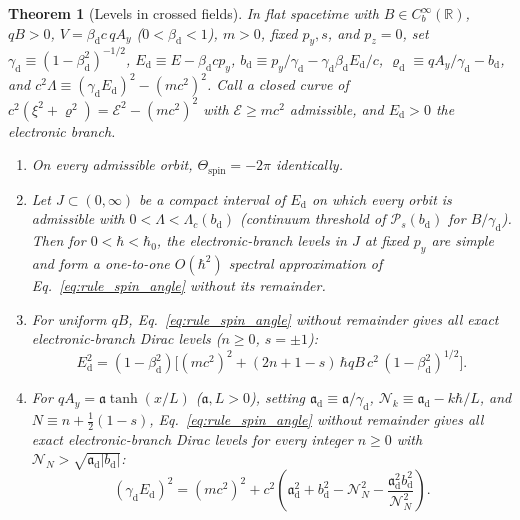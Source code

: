 \documentclass[aps,prd,onecolumn,tightenlines,nofootinbib,notitlepage,10pt,floatfix]{revtex4-2}
\theoremstyle{indentedtheorem}
\newtheorem{theorem}{Theorem}
\begin{document}
\begin{theorem}[Levels in crossed fields]\label{thm:levels_crossed}
In flat spacetime with $B\in C_b^\infty(\mathbb{R})$, $qB>0$, $V=\beta_\text{d}c\,qA_y$ ($0<\beta_\text{d}<1$), $m>0$, fixed $p_y,s$, and $p_z=0$, set $\gamma_\text{d}\equiv(1-\beta_\text{d}^2)^{-1/2}$, $E_\text{d}\equiv E-\beta_\text{d}cp_y$, $b_\text{d}\equiv p_y/\gamma_\text{d}-\gamma_\text{d}\beta_\text{d}E_\text{d}/c$, $\varrho_\text{d}\equiv qA_y/\gamma_\text{d}-b_\text{d}$, and $c^2\Lambda\equiv(\gamma_\text{d}E_\text{d})^2-(mc^2)^2$. Call a closed curve of $c^2(\xi^2+\varrho^2)=\mathcal{E}^2-(mc^2)^2$ with $\mathcal{E}\ge mc^2$ admissible, and $E_\text{d}>0$ the electronic branch.
\begin{enumerate}[label=(\alph*)]
\item On every admissible orbit, $\Theta_\text{spin}=-2\pi$ identically.
\item Let $J\subset(0,\infty)$ be a compact interval of $E_\text{d}$ on which every orbit is admissible with $0<\Lambda<\Lambda_c(b_\text{d})$ (continuum threshold of $\mathcal{P}_s(b_\text{d})$ for $B/\gamma_\text{d}$). Then for $0<\hbar<\hbar_0$, the electronic-branch levels in $J$ at fixed $p_y$ are simple and form a one-to-one $O(\hbar^2)$ spectral approximation of Eq.~\eqref{eq:rule_spin_angle} without its remainder.
\item For uniform $qB$, Eq.~\eqref{eq:rule_spin_angle} without remainder gives all exact electronic-branch Dirac levels ($n\ge 0$, $s=\pm 1$):
\begin{equation}
    E_\text{d}^2 = (1-\beta_\text{d}^2)\Big[(mc^2)^2 + (2n+1-s)\,\hbar qB\,c^2\,(1-\beta_\text{d}^2)^{1/2}\Big] .
    \label{eq:crossed_exact}
\end{equation}
\item For $qA_y=\mathfrak{a}\tanh(x/L)$ ($\mathfrak{a},L>0$), setting $\mathfrak{a}_\text{d}\equiv\mathfrak{a}/\gamma_\text{d}$, $\mathcal{N}_k\equiv\mathfrak{a}_\text{d}-k\hbar/L$, and $N\equiv n+\tfrac{1}{2}(1-s)$, Eq.~\eqref{eq:rule_spin_angle} without remainder gives all exact electronic-branch Dirac levels for every integer $n\ge 0$ with $\mathcal{N}_N>\sqrt{\mathfrak{a}_\text{d}|b_\text{d}|}$:
\begin{equation}
    (\gamma_\text{d}E_\text{d})^2 = (mc^2)^2 + c^2\!\left(\mathfrak{a}_\text{d}^2 + b_\text{d}^2 - \mathcal{N}_N^2 - \frac{\mathfrak{a}_\text{d}^2 b_\text{d}^2}{\mathcal{N}_N^2}\right) .
    \label{eq:crossed_tanh}
\end{equation}
\end{enumerate}
\end{theorem}
\end{document}
